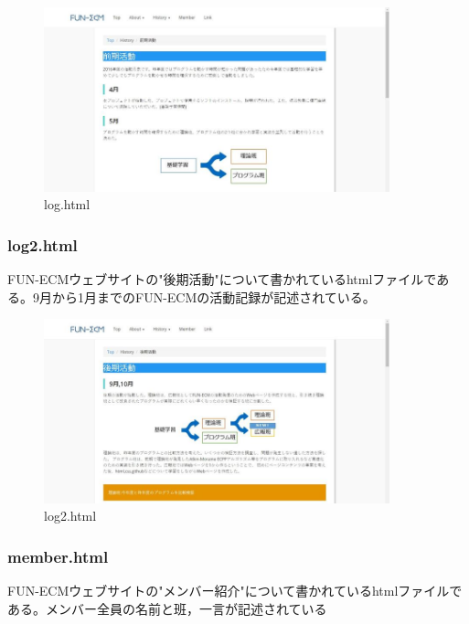 \documentclass[openany,11pt,papersize]{jsbook}
\begin{document}
\begin{figure}[H]
  \begin{center} %
    \includegraphics[clip, width=10.0cm]{./figure/log.png}
    \caption{log.html} %
    \label{log} %
  \end{center}
\end{figure}

\subsubsection{log2.html}
FUN-ECMウェブサイトの"後期活動"について書かれているhtmlファイルである。9月から1月までのFUN-ECMの活動記録が記述されている。

\begin{figure}[H]
  \begin{center} %
    \includegraphics[clip, width=10.0cm]{./figure/log2.png}
    \caption{log2.html} %
    \label{log2} %
  \end{center}
\end{figure}

\subsubsection{member.html}
FUN-ECMウェブサイトの"メンバー紹介"について書かれているhtmlファイルである。メンバー全員の名前と班，一言が記述されている
\end{document}
